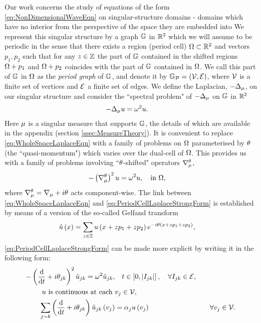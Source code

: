 Our work concerns the study of equations of the form \eqref{eq:NonDimensionalWaveEqn} on singular-structure domains - domains which have no interior from the perspective of the space they are embedded into 
We represent this singular structure by a graph $\mathbb{G}$ in $\mathbb{R}^2$ which we will assume to be periodic in the sense that there exists a region (period cell) $\Omega\subset\mathbb{R}^2$ and vectors $p_1, p_2$ such that for any $z\in\mathbb{Z}$ the part of $\mathbb{G}$ contained in the shifted regions $\Omega+p_1$ and $\Omega+p_2$ coincides with the part of $\mathbb{G}$ contained in $\Omega$.
We call this part of $\mathbb{G}$ in $\Omega$ as the \emph{period graph} of $\mathbb{G}$, and denote it by $\mathbb{G}_{\mathcal{P}}=\left( \mathcal{V}, \mathcal{E} \right)$, where $\mathcal{V}$ is a finite set of vertices and $\mathcal{E}$ a finite set of edges.
We define the Laplacian, $-\Delta_{\mu}$, on our singular structure and consider the ``spectral problem" of $-\Delta_{\mu}$ on $\mathbb{G}$ in $\mathbb{R}^2$
\begin{align} \label{eq:WholeSpaceLaplaceEqn}
	-\Delta_{\mu} u &= \omega^2 u.
\end{align}
Here $\mu$ is a singular measure that supports $\mathbb{G}$, the details of which are available in the appendix (section \ref{ssec:MeasureTheory}).
It is convenient to replace \eqref{eq:WholeSpaceLaplaceEqn} with a family of problems on $\Omega$ parameterised by $\theta$ (the ``quasi-momentum") which varies over the dual-cell of $\Omega$.
This provides us with a family of problems involving ``$\theta$-shifted" operators $\nabla^{\theta}_{\mu}$,
\begin{align} \label{eq:PeriodCellLaplaceStrongForm}
	-\left( \nabla^{\theta}_{\mu} \right)^2 u &= \omega^2 u, \quad\text{in } \Omega,
\end{align}
where $\nabla^{\theta}_{\mu} = \nabla_{\mu} + i\theta$ acts component-wise.
The link between \eqref{eq:WholeSpaceLaplaceEqn} and \eqref{eq:PeriodCellLaplaceStrongForm} is established by means of a version of the so-called Gelfand transform 
\begin{align*}
	\hat{u}\left( x \right) &= \sum_{z\in\mathbb{Z}}u\left( x+zp_1+zp_2 \right)e^{-i\theta\left( x+zp_1+zp_2 \right)},
\end{align*}
\eqref{eq:PeriodCellLaplaceStrongForm} can be made more explicit by writing it in the following form:
\begin{subequations} \label{eq:QGFullSystem}
	\begin{align}
		-\left( \dfrac{\mathrm{d}}{\mathrm{d}t} + i\theta_{jk} \right)^2 \tilde{u}_{jk} = \omega^2 \tilde{u}_{jk}, &\quad t\in\left[ 0,\left\lvert I_{jk} \right\rvert \right], \quad \forall I_{jk}\in \mathcal{E}, \label{eq:QGEdgeODEs} \\
		u \text{ is continuous at each } &v_j \in \mathcal{V}, \label{eq:QGVertCty}\\
		\sum_{j\sim k}\left( \dfrac{\mathrm{d}}{\mathrm{d}t} + i\theta_{jk} \right)\tilde{u}_{jk}\left( v_j \right) &= \alpha_{j}u\left( v_j \right) &\quad \forall v_j \in \mathcal{V}. \label{eq:QGDerivCondition}
	\end{align}
\end{subequations}
